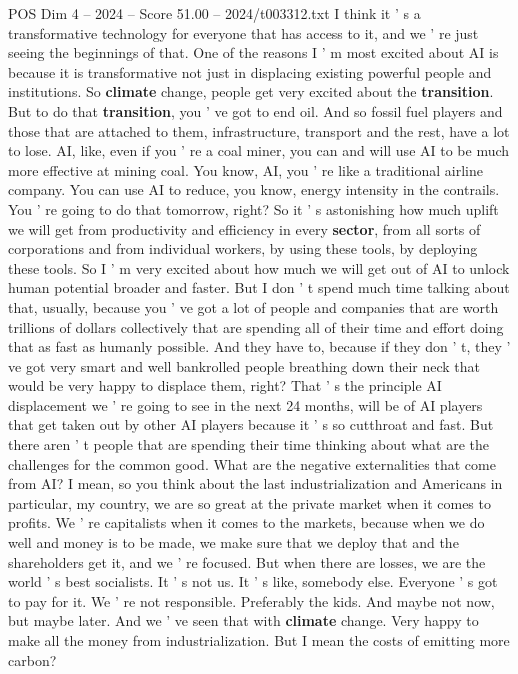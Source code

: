 \begin{textsample}{POS Dim 4 – 2024 – Score 51.00 – 2024/t003312.txt}
I think it ' s a transformative technology for everyone that has access to it, and we ' re just seeing the beginnings of that.
One of the reasons I ' m most excited about AI is because it is transformative not just in displacing existing powerful people and institutions.
So \textbf{climate} change, people get very excited about the \textbf{transition}.
But to do that \textbf{transition}, you ' ve got to end oil.
And so fossil fuel players and those that are attached to them, infrastructure, transport and the rest, have a lot to lose.
AI, like, even if you ' re a coal miner, you can and will use AI to be much more effective at mining coal.
You know, AI, you ' re like a traditional airline company.
You can use AI to reduce, you know, energy intensity in the contrails.
You ' re going to do that tomorrow, right?
So it ' s astonishing how much uplift we will get from productivity and efficiency in every \textbf{sector}, from all sorts of corporations and from individual workers, by using these tools, by deploying these tools.
So I ' m very excited about how much we will get out of AI to unlock human potential broader and faster.
But I don ' t spend much time talking about that, usually, because you ' ve got a lot of people and companies that are worth trillions of dollars collectively that are spending all of their time and effort doing that as fast as humanly possible.
And they have to, because if they don ' t, they ' ve got very smart and well bankrolled people breathing down their neck that would be very happy to displace them, right?
That ' s the principle AI displacement we ' re going to see in the next 24 months, will be of AI players that get taken out by other AI players because it ' s so cutthroat and fast.
But there aren ' t people that are spending their time thinking about what are the challenges for the common good.
What are the negative externalities that come from AI?
I mean, so you think about the last industrialization and Americans in particular, my country, we are so great at the private market when it comes to profits.
We ' re capitalists when it comes to the markets, because when we do well and money is to be made, we make sure that we deploy that and the shareholders get it, and we ' re focused.
But when there are losses, we are the world ' s best socialists.
It ' s not us.
It ' s like, somebody else.
Everyone ' s got to pay for it.
We ' re not responsible.
Preferably the kids.
And maybe not now, but maybe later.
And we ' ve seen that with \textbf{climate} change.
Very happy to make all the money from industrialization.
But I mean the costs of emitting more carbon?

\end{textsample}
